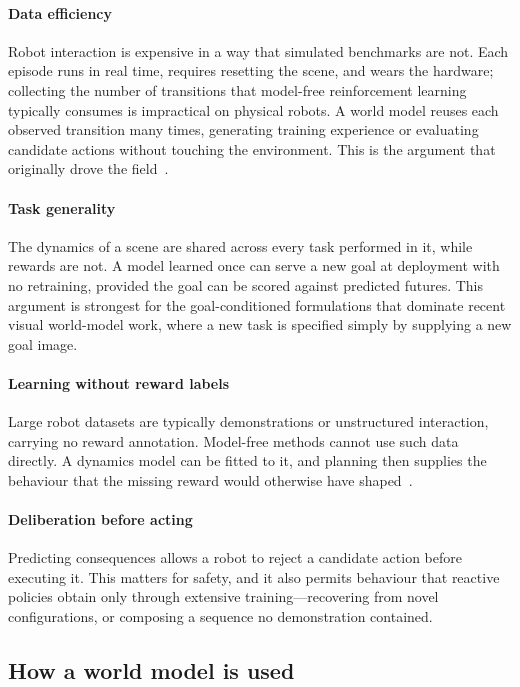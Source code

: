 \documentclass[11pt,letterpaper]{article}
\begin{document}
\paragraph{Data efficiency}
Robot interaction is expensive in a way that simulated benchmarks are not. Each
episode runs in real time, requires resetting the scene, and wears the hardware;
collecting the number of transitions that model-free reinforcement learning
typically consumes is impractical on physical robots. A world model reuses each
observed transition many times, generating training experience or evaluating
candidate actions without touching the environment. This is the argument that
originally drove the field~\citep{ha2018worldmodels,hafner2019planet}.

\paragraph{Task generality}
The dynamics of a scene are shared across every task performed in it, while
rewards are not. A model learned once can serve a new goal at deployment with no
retraining, provided the goal can be scored against predicted futures. This
argument is strongest for the goal-conditioned formulations that dominate recent
visual world-model work, where a new task is specified simply by supplying a new
goal image.

\paragraph{Learning without reward labels}
Large robot datasets are typically demonstrations or unstructured interaction,
carrying no reward annotation. Model-free methods cannot use such data directly.
A dynamics model can be fitted to it, and planning then supplies the behaviour
that the missing reward would otherwise have shaped~\citep{sobal2025pldm}.

\paragraph{Deliberation before acting}
Predicting consequences allows a robot to reject a candidate action before
executing it. This matters for safety, and it also permits behaviour that
reactive policies obtain only through extensive training---recovering from novel
configurations, or composing a sequence no demonstration contained.

\subsection{How a world model is used}
\end{document}
